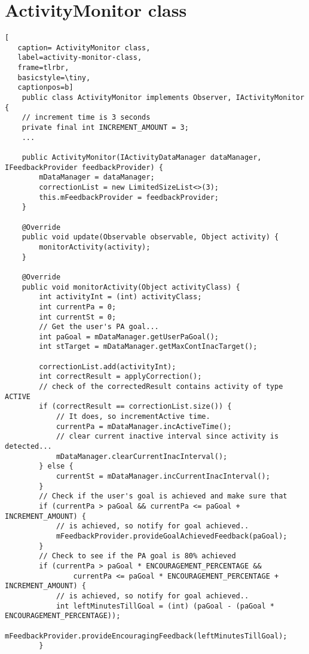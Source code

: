 \chapter{ActivityMonitor class}
\label{chapter:activity-monitor-class}

   \begin{lstlisting}[
   caption= ActivityMonitor class,
   label=activity-monitor-class,
   frame=tlrbr,
   basicstyle=\tiny,
   captionpos=b]
    public class ActivityMonitor implements Observer, IActivityMonitor {
    // increment time is 3 seconds
    private final int INCREMENT_AMOUNT = 3;
    ...

    public ActivityMonitor(IActivityDataManager dataManager, IFeedbackProvider feedbackProvider) {
        mDataManager = dataManager;
        correctionList = new LimitedSizeList<>(3);
        this.mFeedbackProvider = feedbackProvider;
    }

    @Override
    public void update(Observable observable, Object activity) {
        monitorActivity(activity);
    }

    @Override
    public void monitorActivity(Object activityClass) {
        int activityInt = (int) activityClass;
        int currentPa = 0;
        int currentSt = 0;
        // Get the user's PA goal...
        int paGoal = mDataManager.getUserPaGoal();
        int stTarget = mDataManager.getMaxContInacTarget();

        correctionList.add(activityInt);
        int correctResult = applyCorrection();
        // check of the correctedResult contains activity of type ACTIVE
        if (correctResult == correctionList.size()) {
            // It does, so incrementActive time.
            currentPa = mDataManager.incActiveTime();
            // clear current inactive interval since activity is detected...
            mDataManager.clearCurrentInacInterval();
        } else {
            currentSt = mDataManager.incCurrentInacInterval();
        }
        // Check if the user's goal is achieved and make sure that
        if (currentPa > paGoal && currentPa <= paGoal + INCREMENT_AMOUNT) {
            // is achieved, so notify for goal achieved..
            mFeedbackProvider.provideGoalAchievedFeedback(paGoal);
        }
        // Check to see if the PA goal is 80% achieved
        if (currentPa > paGoal * ENCOURAGEMENT_PERCENTAGE &&
                currentPa <= paGoal * ENCOURAGEMENT_PERCENTAGE + INCREMENT_AMOUNT) {
            // is achieved, so notify for goal achieved..
            int leftMinutesTillGoal = (int) (paGoal - (paGoal * ENCOURAGEMENT_PERCENTAGE));
            mFeedbackProvider.provideEncouragingFeedback(leftMinutesTillGoal);
        }


\end{lstlisting}
